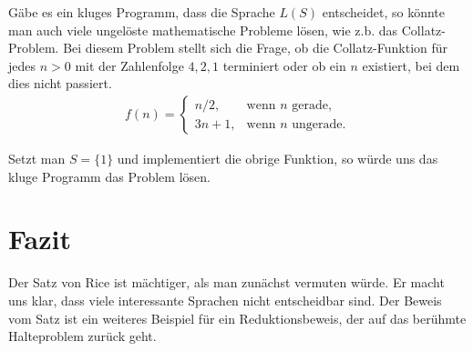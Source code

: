 \documentclass[journal]{IEEEtran}
\begin{document}
Gäbe es ein kluges Programm, dass die Sprache $L(S)$ entscheidet, so könnte man auch viele ungelöste mathematische Probleme lösen, wie z.b. das Collatz-Problem. Bei diesem Problem stellt sich die Frage, ob die Collatz-Funktion für jedes $n > 0$ mit der Zahlenfolge $4, 2, 1$ terminiert oder ob ein $n$ existiert, bei dem dies nicht passiert.
\begin{align*}
  f(n)=\begin{cases}
  n/2,  & \text{wenn }n\text{ gerade,}\\
  3n+1, & \text{wenn }n\text{ ungerade.}
\end{cases}
\end{align*}

Setzt man $S = \{ 1 \}$ und implementiert die obrige Funktion, so würde uns das kluge Programm das Problem lösen.

%



\section{Fazit}

Der Satz von Rice ist mächtiger, als man zunächst vermuten würde. Er macht uns klar, dass viele interessante Sprachen nicht entscheidbar sind. Der Beweis vom Satz ist ein weiteres Beispiel für ein Reduktionsbeweis, der auf das berühmte Halteproblem zurück geht.





%
\end{document}
